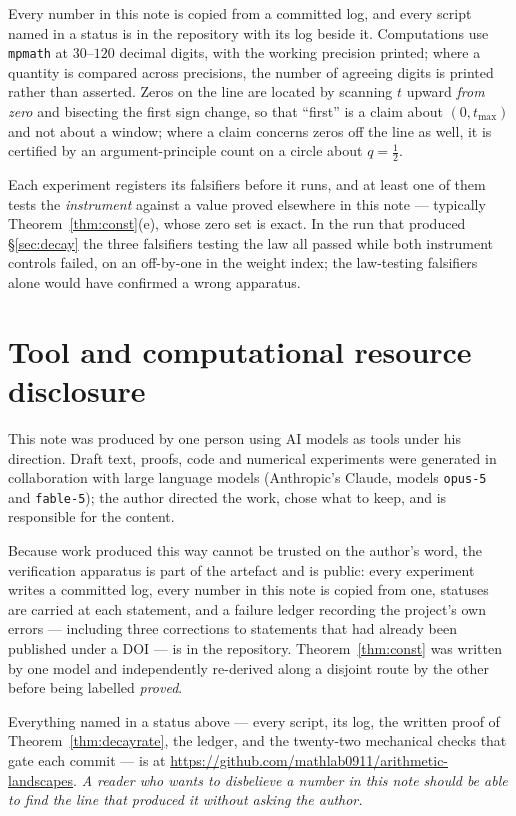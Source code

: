 \documentclass[11pt,a4paper]{article}
\theoremstyle{plain}
\theoremstyle{definition}
\theoremstyle{remark}
\begin{document}
Every number in this note is copied from a committed log, and every script named in a
status is in the repository with its log beside it. Computations use \texttt{mpmath} at
$30$--$120$ decimal digits, with the working precision printed; where a quantity is
compared across precisions, the number of agreeing digits is printed rather than
asserted. Zeros on the line are located by scanning $t$ upward \emph{from zero} and
bisecting the first sign change, so that ``first'' is a claim about $(0,t_{\max})$ and
not about a window; where a claim concerns zeros off the line as well, it is certified
by an argument-principle count on a circle about $q=\tfrac12$.

Each experiment registers its falsifiers before it runs, and at least one of them tests
the \emph{instrument} against a value proved elsewhere in this note --- typically
Theorem~\ref{thm:const}(e), whose zero set is exact. In the run that produced
\S\ref{sec:decay} the three falsifiers testing the law all passed while both instrument
controls failed, on an off-by-one in the weight index; the law-testing falsifiers alone
would have confirmed a wrong apparatus.

\section*{Tool and computational resource disclosure}

This note was produced by one person using AI models as tools under his direction. Draft
text, proofs, code and numerical experiments were generated in collaboration with large
language models (Anthropic's Claude, models \texttt{opus-5} and \texttt{fable-5}); the
author directed the work, chose what to keep, and is responsible for the content.

Because work produced this way cannot be trusted on the author's word, the verification
apparatus is part of the artefact and is public: every experiment writes a committed
log, every number in this note is copied from one, statuses are carried at each
statement, and a failure ledger recording the project's own errors --- including three
corrections to statements that had already been published under a DOI --- is in the
repository. Theorem~\ref{thm:const} was written by one model and independently
re-derived along a disjoint route by the other before being labelled \emph{proved}.

Everything named in a status above --- every script, its log, the written proof of
Theorem~\ref{thm:decayrate}, the ledger, and the twenty-two mechanical checks that gate each
commit --- is at
\url{https://github.com/mathlab0911/arithmetic-landscapes}. \emph{A reader who wants to
disbelieve a number in this note should be able to find the line that produced it without
asking the author.}
\end{document}
